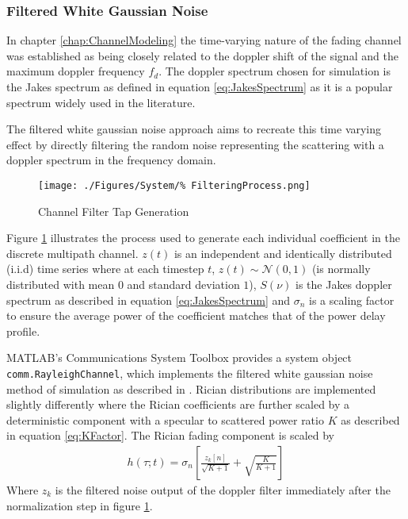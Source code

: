 \subsubsection{Filtered White Gaussian Noise}

In chapter \ref{chap:ChannelModeling} the time-varying nature of %
the fading channel was established as being closely related to the %
doppler shift of the signal and the maximum doppler frequency $f_d$. %
The doppler spectrum chosen for simulation is the Jakes spectrum as %
defined in equation \ref{eq:JakesSpectrum} as it is a popular spectrum %
widely used in the literature. %

The filtered white gaussian noise approach aims to recreate this %
time varying effect by directly filtering the random noise representing %
the scattering with a doppler spectrum in the frequency domain\cite{%
MIMO-OFDM10, Iskander}. 
\begin{figure}[ht]
	\texttt{[image: ./Figures/System/\%
	FilteringProcess.png]}
	\caption{Channel Filter Tap Generation}
	\label{fig:ChannelFilterSimulation}
\end{figure}
Figure \ref{fig:ChannelFilterSimulation} illustrates the process %
used to generate each individual coefficient in the discrete %
multipath channel. $z(t)$ is an independent and identically %
distributed (i.i.d) time series where at each timestep $t$, %
$z(t)\sim\mathcal{N}(0,1)$ (is normally distributed %
with mean $0$ and standard deviation $1$), $S(\nu)$ is the %
Jakes doppler spectrum as described in equation %
\ref{eq:JakesSpectrum} and $\sigma_n$ is %
a scaling factor to ensure the average power of the coefficient %
matches that of the power delay profile.

MATLAB's Communications System Toolbox provides a system object %
\texttt{comm.RayleighChannel}, which implements the filtered %
white gaussian noise method of simulation as described in 
\cite{Iskander}. Rician distributions are implemented slightly %
differently where the Rician coefficients are further scaled by a %
deterministic component with a specular to %
scattered power ratio $K$ as described in equation %
\ref{eq:KFactor}. The Rician fading component is scaled by %
\begin{align}
	h(\tau;t) = \sigma_n\left[ \frac{z_{k}\left[n\right]}
	{\sqrt{K + 1}} + 
	\sqrt{\frac{K}{K+1}}\right]
\end{align}
Where $z_{k}$ is the filtered noise output of the doppler filter 
\cite{Iskander} immediately after the normalization step in figure %
\ref{fig:ChannelFilterSimulation}.

